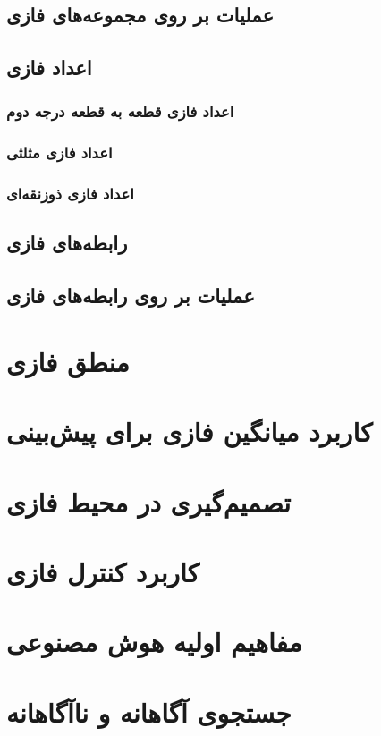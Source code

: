 \documentclass[12pt,a4paper]{article}
\begin{document}
 \subsection{عملیات بر روی مجموعه‌های فازی}
 \subsection{‌اعداد فازی}
  \subsubsection{ ‌اعداد فازی قطعه به قطعه درجه دوم}
  \subsubsection{‌اعداد فازی مثلثی}
  \subsubsection{‌اعداد فازی ذوزنقه‌ای}
 \subsection{رابطه‌های فازی}
 \subsection{عملیات بر روی رابطه‌های فازی}
\section{منطق فازی}
\section{کاربرد میانگین فازی برای پیش‌بینی}
\section{تصمیم‌گیری در محیط فازی}
\section{کاربرد کنترل فازی}
\section{مفاهیم اولیه هوش مصنوعی}
\section{جستجوی آگاهانه و ناآگاهانه}


\end{document}
